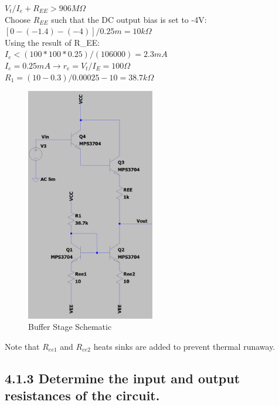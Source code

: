 \documentclass[12pt]{article}
\begin{document}
$V_t / I_e + R_{EE} > 906 M \Omega$ \\

Choose $R_{EE}$ such that the DC output bias is set to -4V: \\

$[0 - (-1.4) - (-4)] / 0.25m = 10k \Omega$ \\ 

Using the result of R_{EE}: \\

$I_e < (100 * 100 * 0.25) / (106 000) = 2.3mA$ \\

$I_e = 0.25mA \rightarrow r_e = V_t / I_E = 100 \Omega$ \\

$R_1 = (10 - 0.3) / 0.00025 - 10 = 38.7k \Omega$

\begin{figure}[H]
    \centering
    \includegraphics[width=0.5\textwidth]{circuit.PNG}
    \caption{Buffer Stage Schematic}
\end{figure}

Note that $R_{ee1}$ and $R_{ee2}$ heats sinks are added to prevent thermal runaway.
    

\subsection*{4.1.3 Determine the input and output resistances of the circuit.}
\end{document}
